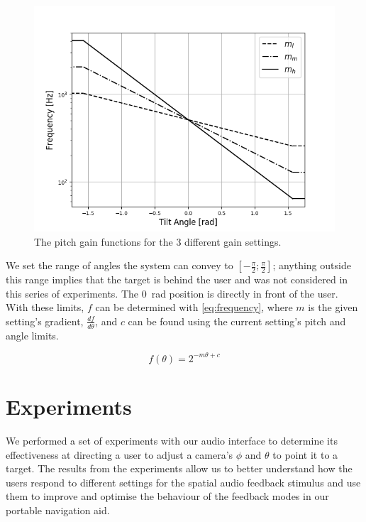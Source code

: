 \documentclass[sigconf, screen=true, anonymous=true]{acmart}
\begin{document}
\begin{figure}
  \centering
  \includegraphics[width=1.0\columnwidth]{figures/pitch_gain_functions.png}
  \caption{The pitch gain functions for the 3 different gain settings. }\label{fig:pitch-gain}
\end{figure}

We set the range of angles the system can convey to $[-\frac{\pi}{2}; \frac{\pi}{2}]$; anything outside this range implies that the target is behind the user and was not considered in this series of experiments. 
The \SI{0}{\radian} position is directly in front of the user.
With these limits, $f$ can be determined with \cref{eq:frequency}, where $m$ is the given setting's gradient, $\frac{df}{d\theta}$, and $c$ can be found using the current setting's pitch and angle limits.

\begin{equation}\label{eq:frequency}
  f(\theta) = 2^{-m\theta + c}
\end{equation}

\section{Experiments}\label{sec:experiments}

We performed a set of experiments with our audio interface to determine its effectiveness at directing a user to adjust a camera's $\phi$ and $\theta$ to point it to a target.
The results from the experiments allow us to better understand how the users respond to different settings for the spatial audio feedback stimulus and use them to improve and optimise the behaviour of the feedback modes in our portable navigation aid.
\end{document}

